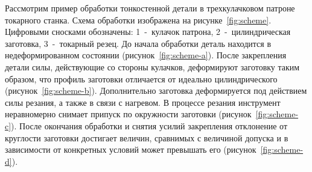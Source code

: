 \documentclass[14pt,oneside,final]{extreport}
\begin{document}
	Рассмотрим пример обработки тонкостенной детали в трехкулачковом патроне токарного станка. Схема обработки изображена на рисунке~\ref{fig:scheme}. Цифровыми сносками обозначены: 1~-~кулачок патрона, 2~-~цилиндрическая заготовка, 3~-~токарный резец. До начала обработки деталь находится в недеформированном состоянии (рисунок~\ref{fig:scheme-a}). После закрепления детали силы, действующие со стороны кулачков, деформируют заготовку таким образом, что профиль заготовки отличается от идеально цилиндрического (рисунок~\ref{fig:scheme-b}). Дополнительно заготовка деформируется под действием силы резания, а также в связи с нагревом. В процессе резания инструмент неравномерно снимает припуск по окружности заготовки (рисунок~\ref{fig:scheme-c}). После окончания обработки и снятия усилий закрепления отклонение от круглости заготовки достигает величин, сравнимых с величиной допуска и в зависимости от конкретных условий может превышать его (рисунок~\ref{fig:scheme-d}).
	
\end{document}
